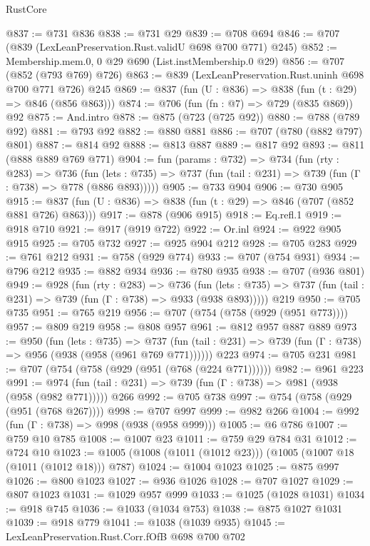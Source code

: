 \begin{lexlean}{RustCore}
\begin{coremodule}
@837 := @731 @836
@838 := @731 @29
@839 := @708 @694
@846 := @707 (@839 (LexLeanPreservation.Rust.validU @698 @700 @771) @245)
@852 := Membership.mem.{0, 0} @29 @690 (List.instMembership.{0} @29)
@856 := @707 (@852 (@793 @769) @726)
@863 := @839 (LexLeanPreservation.Rust.uninh @698 @700 @771 @726) @245
@869 := @837 (fun (U : @836) => @838 (fun (t : @29) => @846 (@856 @863)))
@874 := @706 (fun (fn : @7) => @729 (@835 @869)) @92
@875 := And.intro
@878 := @875 (@723 (@725 @92))
@880 := @788 (@789 @92)
@881 := @793 @92
@882 := @880 @881
@886 := @707 (@780 (@882 @797) @801)
@887 := @814 @92
@888 := @813 @887
@889 := @817 @92
@893 := @811 (@888 @889 @769 @771)
@904 := fun (params : @732) =>
  @734
    (fun (rty : @283) =>
    @736
      (fun (lets : @735) => @737 (fun (tail : @231) => @739 (fun (Γ : @738) => @778 (@886 @893)))))
@905 := @733 @904
@906 := @730 @905
@915 := @837 (fun (U : @836) => @838 (fun (t : @29) => @846 (@707 (@852 @881 @726) @863)))
@917 := @878 (@906 @915)
@918 := Eq.refl.{1}
@919 := @918 @710
@921 := @917 (@919 @722)
@922 := Or.inl
@924 := @922 @905 @915
@925 := @705 @732
@927 := @925 @904 @212
@928 := @705 @283
@929 := @761 @212
@931 := @758 (@929 @774)
@933 := @707 (@754 @931)
@934 := @796 @212
@935 := @882 @934
@936 := @780 @935
@938 := @707 (@936 @801)
@949 := @928
    (fun (rty : @283) =>
    @736
      (fun (lets : @735) => @737 (fun (tail : @231) => @739 (fun (Γ : @738) => @933 (@938 @893)))))
    @219
@950 := @705 @735
@951 := @765 @219
@956 := @707 (@754 (@758 (@929 (@951 @773))))
@957 := @809 @219
@958 := @808 @957
@961 := @812 @957 @887 @889
@973 := @950
    (fun (lets : @735) =>
    @737 (fun (tail : @231) => @739 (fun (Γ : @738) => @956 (@938 (@958 (@961 @769 @771))))))
    @223
@974 := @705 @231
@981 := @707 (@754 (@758 (@929 (@951 (@768 (@224 @771))))))
@982 := @961 @223
@991 := @974 (fun (tail : @231) => @739 (fun (Γ : @738) => @981 (@938 (@958 (@982 @771))))) @266
@992 := @705 @738
@997 := @754 (@758 (@929 (@951 (@768 @267))))
@998 := @707 @997
@999 := @982 @266
@1004 := @992 (fun (Γ : @738) => @998 (@938 (@958 @999)))
@1005 := @6 @786
@1007 := @759 @10 @785
@1008 := @1007 @23
@1011 := @759 @29 @784 @31
@1012 := @724 @10
@1023 := @1005 (@1008 (@1011 (@1012 @23))) (@1005 (@1007 @18 (@1011 (@1012 @18))) @787)
@1024 := @1004 @1023
@1025 := @875 @997
@1026 := @800 @1023
@1027 := @936 @1026
@1028 := @707 @1027
@1029 := @807 @1023
@1031 := @1029 @957 @999
@1033 := @1025 (@1028 @1031)
@1034 := @918 @745
@1036 := @1033 (@1034 @753)
@1038 := @875 @1027 @1031
@1039 := @918 @779
@1041 := @1038 (@1039 @935)
@1045 := LexLeanPreservation.Rust.Corr.fOfB @698 @700 @702

\end{coremodule}
\end{lexlean}
